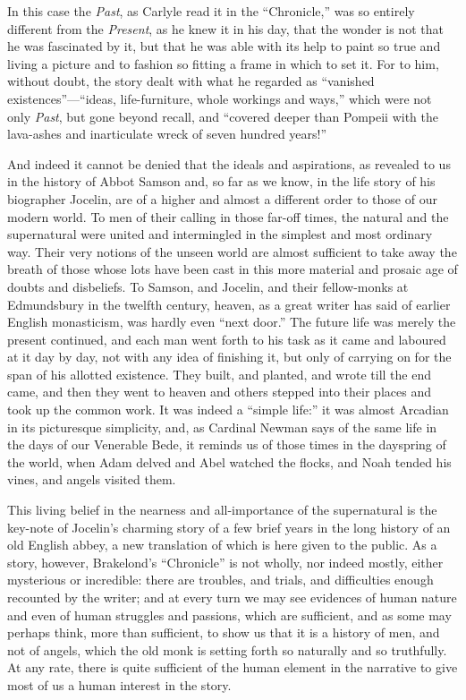 \documentclass[10pt]{book}
\begin{document}
{{{In this case the \emph{Past}, as Carlyle read it in the ``Chronicle,'' was so entirely different from the \emph{Present}, as he knew it in his day, that the wonder is not that he was fascinated by it, but that he was able with its help to paint so true and living a picture and to fashion so fitting a frame in which to set it. For to him, without doubt, the story dealt with what he regarded as ``vanished existences''---``ideas, life-furniture, whole workings and ways,'' which were not only \emph{Past}, but gone beyond recall, and ``covered deeper than Pompeii with the lava-ashes and inarticulate wreck of seven hundred years!''

And indeed it cannot be denied that the ideals and aspirations, as revealed to us in the history of Abbot Samson and, so far as we know, in the life story of his biographer Jocelin, are of a higher and almost a different order to those of our modern world. To men of their calling in those far-off times, the natural and the supernatural were united and intermingled in the simplest and most ordinary way. Their very notions of the unseen world are almost sufficient to take away the breath of those whose lots have been cast in this more material and prosaic age of doubts and disbeliefs. To Samson, and Jocelin, and their fellow-monks at Edmundsbury in the twelfth century, heaven, as a great writer has said of earlier English monasticism, was hardly even ``next door.'' The future life was merely the present continued, and each man went forth to his task as it came and laboured at it day by day, not with any idea of finishing it, but only of carrying on for the span of his allotted existence. They built, and planted, and wrote till the end came, and then they went to heaven and others stepped into their places and took up the common work. It was indeed a ``simple life:'' it was almost Arcadian in its picturesque simplicity, and, as Cardinal Newman says of the same life in the days of our Venerable Bede, it reminds us of those times in the dayspring of the world, when Adam delved and Abel watched the flocks, and Noah tended his vines, and angels visited them.

This living belief in the nearness and all-importance of the supernatural is the key-note of Jocelin's charming story of a few brief years in the long history of an old English abbey, a new translation of which is here given to the public. As a story, however, Brakelond's ``Chronicle'' is not wholly, nor indeed mostly, either mysterious or incredible: there are troubles, and trials, and difficulties enough recounted by the writer; and at every turn we may see evidences of human nature and even of human struggles and passions, which are sufficient, and as some may perhaps think, more than sufficient, to show us that it is a history of men, and not of angels, which the old monk is setting forth so naturally and so truthfully. At any rate, there is quite sufficient of the human element in the narrative to give most of us a human interest in the story.

}}}
\end{document}
